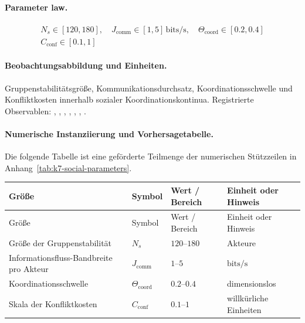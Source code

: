 \paragraph{Parameter law.}
\[
\begin{gathered} N_s \in [120,180],\quad J_{\mathrm{comm}} \in [1,5]\,\mathrm{bits/s},\quad \Theta_{\mathrm{coord}} \in [0.2,0.4] \\ C_{\mathrm{conf}} \in [0.1,1] \end{gathered}
\]

\paragraph{Beobachtungsabbildung und Einheiten.}
Gruppenstabilitätsgröße, Kommunikationsdurchsatz, Koordinationsschwelle und Konfliktkosten innerhalb sozialer Koordinationskontinua.
Registrierte Observablen: , \allowbreak {}, \allowbreak {}, \allowbreak {}, \allowbreak {}, \allowbreak {}, \allowbreak {}.

\paragraph{Numerische Instanziierung und Vorhersagetabelle.}
Die folgende Tabelle ist eine geförderte Teilmenge der numerischen Stützzeilen in Anhang~\ref{tab:k7-social-parameters}.
\begin{longtable}{@{}L{0.27\textwidth}L{0.15\textwidth}L{0.24\textwidth}L{0.16\textwidth}@{}}
\toprule
Größe & Symbol & Wert / Bereich & Einheit oder Hinweis \\
\midrule
\endfirsthead
\toprule
Größe & Symbol & Wert / Bereich & Einheit oder Hinweis \\
\midrule
\endhead
Größe der Gruppenstabilität & $\scriptstyle N_s$ & $120\text{--}180$ & Akteure \\
Informationsfluss-Bandbreite pro Akteur & $\scriptstyle J_{\mathrm{comm}}$ & $1\text{--}5$ & $\mathrm{bits/s}$ \\
Koordinationsschwelle & $\scriptstyle \Theta_{\mathrm{coord}}$ & $0.2\text{--}0.4$ & dimensionslos \\
Skala der Konfliktkosten & $\scriptstyle C_{\mathrm{conf}}$ & $0.1\text{--}1$ & willkürliche Einheiten \\
\bottomrule
\end{longtable}

